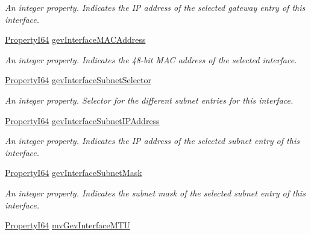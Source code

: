 \begin{DoxyCompactItemize}
\begin{DoxyCompactList}\small\item\em An integer property. Indicates the I\+P address of the selected gateway entry of this interface. \end{DoxyCompactList}\item 
\hyperlink{group___common_interface_ga81749b2696755513663492664a18a893}{Property\+I64} \hyperlink{classmv_i_m_p_a_c_t_1_1acquire_1_1_gen_i_cam_1_1_interface_module_affb1e587603d3b11a90dd56ca22b61ed}{gev\+Interface\+M\+A\+C\+Address}
\begin{DoxyCompactList}\small\item\em An integer property. Indicates the 48-\/bit M\+A\+C address of the selected interface. \end{DoxyCompactList}\item 
\hyperlink{group___common_interface_ga81749b2696755513663492664a18a893}{Property\+I64} \hyperlink{classmv_i_m_p_a_c_t_1_1acquire_1_1_gen_i_cam_1_1_interface_module_aeea840be72dd655aaca87367456708b8}{gev\+Interface\+Subnet\+Selector}
\begin{DoxyCompactList}\small\item\em An integer property. Selector for the different subnet entries for this interface. \end{DoxyCompactList}\item 
\hyperlink{group___common_interface_ga81749b2696755513663492664a18a893}{Property\+I64} \hyperlink{classmv_i_m_p_a_c_t_1_1acquire_1_1_gen_i_cam_1_1_interface_module_a147edfbcbef7561103894d3c5e9c080a}{gev\+Interface\+Subnet\+I\+P\+Address}
\begin{DoxyCompactList}\small\item\em An integer property. Indicates the I\+P address of the selected subnet entry of this interface. \end{DoxyCompactList}\item 
\hyperlink{group___common_interface_ga81749b2696755513663492664a18a893}{Property\+I64} \hyperlink{classmv_i_m_p_a_c_t_1_1acquire_1_1_gen_i_cam_1_1_interface_module_aa8456ede212088d460ea5c2b90242f1b}{gev\+Interface\+Subnet\+Mask}
\begin{DoxyCompactList}\small\item\em An integer property. Indicates the subnet mask of the selected subnet entry of this interface. \end{DoxyCompactList}\item 
\hyperlink{group___common_interface_ga81749b2696755513663492664a18a893}{Property\+I64} \hyperlink{classmv_i_m_p_a_c_t_1_1acquire_1_1_gen_i_cam_1_1_interface_module_a1866ed99420adc65f2280ba004697513}{mv\+Gev\+Interface\+M\+T\+U}

\end{DoxyCompactItemize}
